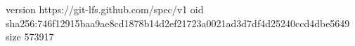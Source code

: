 version https://git-lfs.github.com/spec/v1
oid sha256:746f12915baa9ae8cd1878b14d2ef21723a0021ad3d7df4d25240ccd4dbe5649
size 573917
